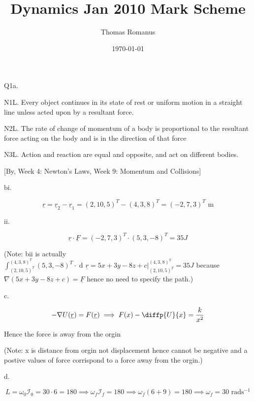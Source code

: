 \documentclass[12pt]{article}
\title{Dynamics Jan 2010 Mark Scheme}
\author{Thomas Romanus}
\date{\today}
\DeclareMathOperator{\di}{d\!}
\begin{document}
    \maketitle

    Q1a.

    N1L.  Every object continues in its state of rest or uniform motion in a straight line unless acted upon by a resultant force.

    N2L.  The rate of change of momentum of a body is proportional to the resultant force acting on the body and is in the direction of that force

    N3L.  Action and reaction are equal and opposite, and act on different bodies.

    [By, Week 4: Newton's Laws, Week 9: Momentum and Collisions]

    bi.

    \begin{equation*}
        \underline{r}=\underline{r}_2-\underline{r}_1=(2,10,5)^T-(4,3,8)^T=(-2,7,3)^T\text{ m}
    \end{equation*}

    ii.

    \begin{equation*}
        \underline{r}\cdot\underline{F}=(-2,7,3)^T\cdot (5,3,-8)^T=35J
    \end{equation*}

    (Note: bii is actually $\int_{(2,10,5)^T}^{(4,3,8)^T}(5,3,-8)^T\cdot\di \underline{r}=5x+3y-8z+c|_{(2,10,5)^T}^{(4,3,8)^T}=35J$ because $\nabla (5x+3y-8z+c)=\underline{F}$ hence no need to specify the path.)

    c.

    \begin{equation*}
        -\nabla U(\underline{r})=F(\underline{r})\implies F(x)-\diffp{U}{x}=\frac{k}{x^2}
    \end{equation*}

    Hence the force is away from the orgin

    (Note: x is distance from orgin not displacement hence cannot be negative and a postive values of force corrispond to a force away from the orgin.)

    d.

    \begin{equation*}
        L=\omega_0 \mathcal{I}_0=30\cdot6=180\implies\omega_f\mathcal{I}_f=180\implies\omega_f(6+9)=180\implies\omega_f=30\text{ rads$^{-1}$}
    \end{equation*}
\end{document}
